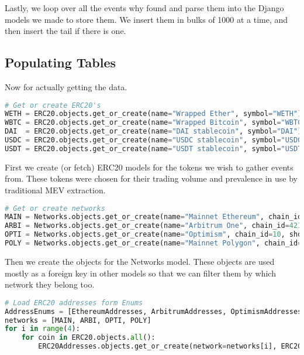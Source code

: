 Lastly, we loop over all the events why found and parse them into the Django models we made to store them. We insert them in bulks of 1000 at a time, and then insert the tail if there is one. 



\subsection{Populating Tables}
Now for actually getting the data.
\begin{lstlisting}[language=python]
# Get or create ERC20's
WETH = ERC20.objects.get_or_create(name="Wrapped Ether", symbol="WETH")[0]
WBTC = ERC20.objects.get_or_create(name="Wrapped Bitcoin", symbol="WBTC", decimals=8)[0]
DAI  = ERC20.objects.get_or_create(name="DAI stablecoin", symbol="DAI")[0]
USDC = ERC20.objects.get_or_create(name="USDC stablecoin", symbol="USDC", decimals=6)[0]
USDT = ERC20.objects.get_or_create(name="USDT stablecoin", symbol="USDT", decimals=6)[0]
\end{lstlisting}
 
First we create (or fetch) ERC20 models for the tokens we wish to gather events from. These tokens were chosen for their trading volume and prevalence in use by traditional MEV extraction.

\begin{lstlisting}[language=python]
# Get or create networks
MAIN = Networks.objects.get_or_create(name="Mainnet Ethereum", chain_id=1, short="MAIN")[0]
ARBI = Networks.objects.get_or_create(name="Arbitrum One", chain_id=42161, short="ARBI")[0]
OPTI = Networks.objects.get_or_create(name="Optimism", chain_id=10, short="OPTI")[0]
POLY = Networks.objects.get_or_create(name="Mainnet Polygon", chain_id=137, short="POLY")[0]
\end{lstlisting}

Then we create the objects for the Networks model. These objects are used mostly as a foreign key in other models so that we can filter them by which network they belong too.


\begin{lstlisting}[language=python]
# Load ERC20 addresses form Enums
AddressEnums = [EthereumAddresses, ArbitrumAddresses, OptimismAddresses, PolygonAddresses]
networks = [MAIN, ARBI, OPTI, POLY]
for i in range(4):
    for coin in ERC20.objects.all():
        ERC20Addresses.objects.get_or_create(network=networks[i], ERC20=coin, address=AddressEnums[i][coin.symbol].value)
\end{lstlisting}

